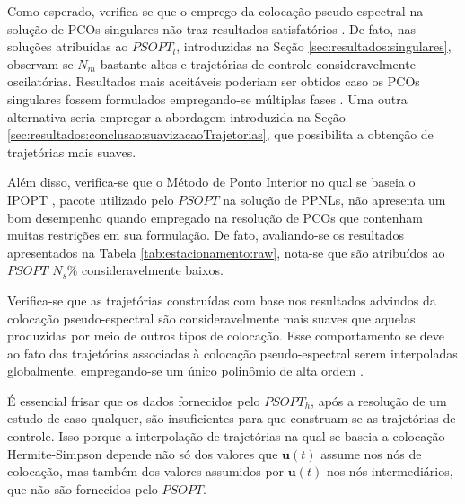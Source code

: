 
Como esperado, verifica-se que o emprego da colocação pseudo-espectral na solução de PCOs singulares não traz resultados satisfatórios \cite{becerra_tutorial_2010}. De fato, nas soluções atribuídas ao $ PSOPT_l $, introduzidas na Seção \ref{sec:resultados:singulares}, observam-se $ N_m $ bastante altos e trajetórias de controle consideravelmente oscilatórias. Resultados mais aceitáveis poderiam ser obtidos caso os PCOs singulares fossem formulados empregando-se múltiplas fases \cite{nascentes_resolucao_2012}. Uma outra alternativa seria empregar a abordagem introduzida na Seção \ref{sec:resultados:conclusao:suavizacaoTrajetorias}, que possibilita a obtenção de trajetórias mais suaves.


Além disso, verifica-se que o Método de Ponto Interior no qual se baseia o IPOPT \cite{wachter_implementation_2006}, pacote utilizado pelo $ PSOPT $ na solução de PPNLs, não apresenta um bom desempenho quando empregado na resolução de PCOs que contenham muitas restrições em sua formulação. De fato, avaliando-se os resultados apresentados na Tabela \ref{tab:estacionamento:raw}, nota-se que são atribuídos ao $ PSOPT $ $ N_s\% $ consideravelmente baixos. 


Verifica-se que as trajetórias construídas com base nos resultados advindos da colocação pseudo-espectral são consideravelmente mais suaves que aquelas produzidas por meio de outros tipos de colocação. Esse comportamento se deve ao fato das trajetórias associadas à colocação pseudo-espectral serem interpoladas globalmente, empregando-se um único polinômio de alta ordem \cite{becerra_psopt_2019}. 


É essencial frisar que os dados fornecidos pelo $ PSOPT_h $, após a resolução de um estudo de caso qualquer, são insuficientes para que construam-se as trajetórias de controle. Isso porque a interpolação de trajetórias na qual se baseia a colocação Hermite-Simpson depende não só dos valores que $ \mathbf{u}(t) $ assume nos nós de colocação, mas também dos valores assumidos por $ \mathbf{u}(t) $ nos nós intermediários, que não são fornecidos pelo $ PSOPT $. 

